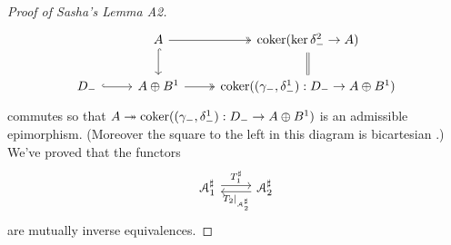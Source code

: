 \documentclass[deligne.tex]{subfiles}
\begin{document}
\begin{proof}[Proof of Sasha's Lemma A2]
\begin{equation*}
\begin{tikzcd}
	&A\arrow[d,hook]\arrow[r,twoheadrightarrow]
	&\coker(\ker\delta_-^2\ra A)\arrow[d,equals] \\
	D_-\arrow[r,hook]&A\oplus B^1\arrow[r,twoheadrightarrow]
	&\coker((\gamma_-,\delta_-^1):D_-\ra A\oplus B^1)
\end{tikzcd}\end{equation*}
commutes so that
$A\twoheadrightarrow\operatorname{coker}((\gamma_-,\delta_-^1):D_-\rightarrow A\oplus B^1)$ is
an admissible epimorphism.
(Moreover the square to the left in this diagram is bicartesian \cite[2.12]{buhler}.)
We've proved that the functors
\begin{equation*}\begin{tikzcd}
	\mathcal A_1^\sharp\arrow[r,"T_1^\sharp",shift left]
	&\mathcal A_2^\sharp\arrow[l,"T_2|_{\mathcal A_2^\sharp}",shift left]
\end{tikzcd}\end{equation*}
are mutually inverse equivalences.
\end{proof}
\end{document}
